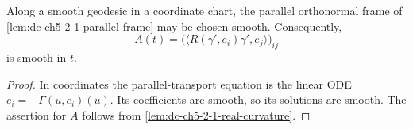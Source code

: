 \begin{lemma}
  \label{lem:dc-ch5-2-7-frame-smooth}
  \leanok
  Along a smooth geodesic in a coordinate chart, the parallel orthonormal frame
  of \cref{lem:dc-ch5-2-1-parallel-frame} may be chosen smooth. Consequently,
  $$
  A(t)=\big(\langle R(\gamma',e_i)\gamma',e_j\rangle\big)_{ij}
  $$
  is smooth in $t$.
\end{lemma}
\begin{proof}

  \sketch
  In coordinates the parallel-transport equation is the linear ODE
  $\dot e_i=-\Gamma(\dot u,e_i)(u)$. Its coefficients are smooth, so its
  solutions are smooth. The assertion for $A$ follows from
  \cref{lem:dc-ch5-2-1-real-curvature}.
\end{proof}

